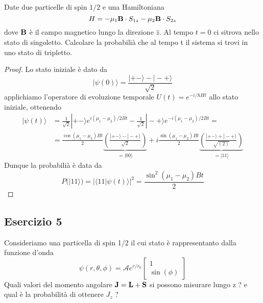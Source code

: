 Date due particelle di spin $1/2$ e una Hamiltoniana 
\begin{equation*}
	H = - \mu_1 \bold{B} \cdot S_{1z} - \mu_2 \bold{B} \cdot S_{2z}
\end{equation*}
dove $\bold{B} $ \`e il campo magnetico lungo la direzione $\hat{z}$. Al tempo $t=0$ ci sitrova nello stato di singoletto. Calcolare la probabili\`a che al tempo t il sistema si trovi in uno stato di tripletto.

\begin{proof}
	Lo stato iniziale \`e dato da 
	\begin{equation*}
		|\psi(0) \rangle = \frac{|+-\rangle - |-+\rangle}{\sqrt{2}}
	\end{equation*}
applichiamo l'operatore di evoluzione temporale $U(t) = e^{-i/\hbar Ht }$ allo stato iniziale, ottenendo
\begin{align*}
	|\psi(t) \rangle & = \frac{1}{\sqrt{2}}|+-\rangle e^{i(\mu_1-\mu_2)/2Bt} - \frac{1}{\sqrt{2}}|-+\rangle e^{-i(\mu_1-\mu_2)/2Bt}= \\[0.5cm]
	& = \frac{\cos(\mu_1-\mu_2)Bt}{2} \underbrace{\left(\frac{|+- \rangle - |-+\rangle}{\sqrt{2}}\right)}_{= |00\rangle} +i \frac{\sin(\mu_1-\mu_2)Bt}{2} \underbrace{ \left(\frac{|+-\rangle + |-+\rangle}{\sqrt{(2)}}\right)}_{= |11 \rangle }
\end{align*}
Dunque la probabili\`a \`e data da 
\begin{equation*}
	P(|11\rangle) = |\langle 11 |\psi(t) \rangle|^2 = \frac{\sin^2(\mu_1-\mu_2)Bt}{2}
\end{equation*}

\end{proof}

\subsection{Esercizio 5}

Consideriamo una particella di spin 1/2  il cui stato \`e rappresentanto dalla funzione d'onda 
\begin{equation*}
	\psi(r,\theta,\phi) = \mathcal{A} e^{r/r_0} \left[\begin{array}{l}
		1 \\ \sin(\phi) 
	\end{array}\right]
\end{equation*}
Quali valori del momento angolare $\bold{J} = \bold{L}+\bold{S}$ si possono misurare lungo z ? e qual \`e la probabilit\`a di ottenere $J_z$ ?

